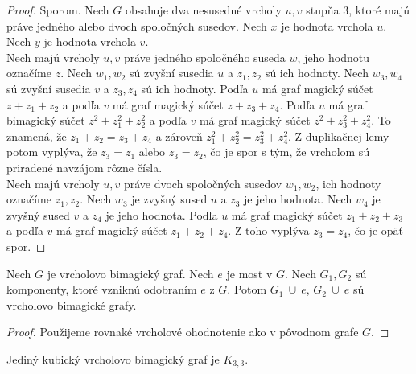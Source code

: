 \begin{proof} Sporom. Nech $G$ obsahuje dva nesusedné vrcholy $u,v$ stupňa $3$, ktoré majú práve jedného alebo dvoch spoločných susedov. Nech $x$ je hodnota vrchola $u$. Nech $y$ je hodnota vrchola $v$. \\

Nech majú vrcholy $u,v$ práve jedného spoločného suseda $w$, jeho hodnotu označíme $z$. Nech $w_1, w_2$ sú zvyšní susedia $u$ a $z_1, z_2$ sú ich hodnoty. Nech $w_3, w_4$ sú zvyšní susedia $v$ a $z_3, z_4$ sú ich hodnoty. Podľa $u$ má graf magický súčet $z + z_1 + z_2$ a podľa $v$ má graf magický súčet $z + z_3 + z_4$. Podľa $u$ má graf bimagický súčet $z^2 + z^2_1 + z^2_2$ a podľa $v$ má graf magický súčet $z^2 + z^2_3 + z^2_4$. To znamená, že $z_1 + z_2 = z_3 + z_4$ a zároveň $z^2_1 + z^2_2 = z^2_3 + z^2_4$. Z duplikačnej lemy potom vyplýva, že $z_3 = z_1$ alebo $z_3 = z_2$, čo je spor s tým, že vrcholom sú priradené navzájom rôzne čísla. \\

Nech majú vrcholy $u,v$ práve dvoch spoločných susedov $w_1, w_2$, ich hodnoty označíme $z_1, z_2$. Nech $w_3$ je zvyšný sused $u$ a $z_3$ je jeho hodnota. Nech $w_4$ je zvyšný sused $v$ a $z_4$ je jeho hodnota. Podľa $u$ má graf magický súčet $z_1 + z_2 + z_3$ a podľa $v$ má graf magický súčet $z_1 + z_2 + z_4$. Z toho vyplýva $z_3 = z_4$, čo je opäť spor.
\end{proof}

\begin{theorem} Nech $G$ je vrcholovo bimagický graf. Nech $e$ je most v $G$. Nech $G_1, G_2$ sú komponenty, ktoré vzniknú odobraním $e$ z $G$. Potom $G_1 ~\cup~ e$, $G_2 ~\cup~ e$ sú vrcholovo bimagické grafy. 
\end{theorem}

\begin{proof}
Použijeme rovnaké vrcholové ohodnotenie ako v pôvodnom grafe $G$.
\end{proof}

\begin{theorem} Jediný kubický vrcholovo bimagický graf je $K_{3,3}$.
\end{theorem}

